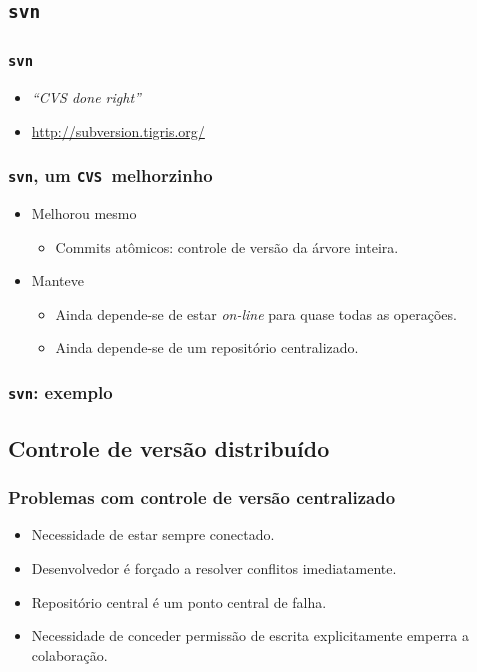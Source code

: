 \documentclass{beamer}
\newcommand{\svn}{\texttt{svn}}
\newcommand{\cvs}{\texttt{CVS}}
\begin{document}
\subsection{\svn}

\begin{frame}
  \frametitle{\svn}
  \begin{itemize}
    \item \emph{``CVS done right''}
    \item \url{http://subversion.tigris.org/}
  \end{itemize}
\end{frame}

\begin{frame}
  \frametitle{\svn, um \cvs\ melhorzinho}
  \begin{itemize}
    \item Melhorou mesmo
      \begin{itemize}
        \item Commits atômicos: controle de versão da árvore inteira.
      \end{itemize}
    \item Manteve
      \begin{itemize}
        \item Ainda depende-se de estar \emph{on-line} para quase todas
          as operações.
        \item Ainda depende-se de um repositório centralizado.
      \end{itemize}
  \end{itemize}
\end{frame}

\begin{frame}
  \frametitle{\svn: exemplo}
  \begin{figure}[h]
    \begin{center}
    \end{center}
    \label{fig:svn}
  \end{figure}
\end{frame}


\subsection{Controle de versão distribuído}

\begin{frame}
  \frametitle{Problemas com controle de versão centralizado}
  \begin{itemize}
      \pause
    \item Necessidade de estar sempre conectado.
      \pause
    \item Desenvolvedor é forçado a resolver conflitos imediatamente.
      \pause
    \item Repositório central é um ponto central de falha.
      \pause
    \item Necessidade de conceder permissão de escrita explicitamente
      emperra a colaboração.
  \end{itemize}
\end{frame}
\end{document}
